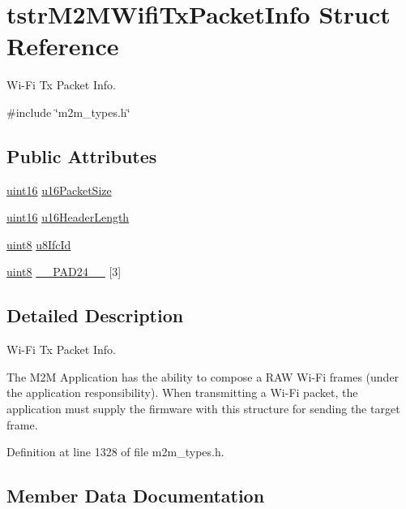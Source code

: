 \hypertarget{structtstrM2MWifiTxPacketInfo}{}\section{tstr\+M2\+M\+Wifi\+Tx\+Packet\+Info Struct Reference}
\label{structtstrM2MWifiTxPacketInfo}


Wi-\/\+Fi Tx Packet Info.  




{\ttfamily \#include \char`\"{}m2m\+\_\+types.\+h\char`\"{}}

\subsection*{Public Attributes}
\begin{DoxyCompactItemize}
\item 
\hyperlink{group__DataT_ga1daa745171fc6e31d942c161422a76f9}{uint16} \hyperlink{structtstrM2MWifiTxPacketInfo_a4cd9dd241fe12bc078100cebf1298e20}{u16\+Packet\+Size}
\item 
\hyperlink{group__DataT_ga1daa745171fc6e31d942c161422a76f9}{uint16} \hyperlink{structtstrM2MWifiTxPacketInfo_a6890b3d90c9578aa3ecaa545fabe5860}{u16\+Header\+Length}
\item 
\hyperlink{group__DataT_ga4df709a77647e870bbf1d955b8edc9a6}{uint8} \hyperlink{structtstrM2MWifiTxPacketInfo_a87f26b61d68dde10573a1b260452bc78}{u8\+Ifc\+Id}
\item 
\hyperlink{group__DataT_ga4df709a77647e870bbf1d955b8edc9a6}{uint8} \hyperlink{structtstrM2MWifiTxPacketInfo_a15574a46b3d3d949f087366969f82417}{\+\_\+\+\_\+\+P\+A\+D24\+\_\+\+\_\+} \mbox{[}3\mbox{]}
\end{DoxyCompactItemize}


\subsection{Detailed Description}
Wi-\/\+Fi Tx Packet Info. 

The M2M Application has the ability to compose a R\+AW Wi-\/\+Fi frames (under the application responsibility). When transmitting a Wi-\/\+Fi packet, the application must supply the firmware with this structure for sending the target frame. 

Definition at line 1328 of file m2m\+\_\+types.\+h.



\subsection{Member Data Documentation}
\mbox{\label{structtstrM2MWifiTxPacketInfo_a15574a46b3d3d949f087366969f82417}} 
